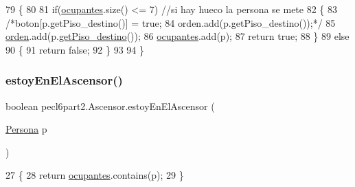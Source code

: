 \begin{DoxyCode}
79     \{
80         
81         \textcolor{keywordflow}{if}(\mbox{\hyperlink{classpecl6part2_1_1_ascensor_af4dd01a24c9588e94061d4e61045563a}{ocupantes}}.size() <= 7) \textcolor{comment}{//si hay hueco la persona se mete}
82         \{
83             \textcolor{comment}{/*boton[p.getPiso\_destino()] = true;}
84 \textcolor{comment}{            orden.add(p.getPiso\_destino());*/}
85             \mbox{\hyperlink{classpecl6part2_1_1_ascensor_a92a9c3265671bd3d2654626f62094cf9}{orden}}.add(p.\mbox{\hyperlink{classpecl6part1_1_1_persona_a82e55b6a597ab6cc0aa1d8fcfed9164b}{getPiso\_destino}}());
86             \mbox{\hyperlink{classpecl6part2_1_1_ascensor_af4dd01a24c9588e94061d4e61045563a}{ocupantes}}.add(p);
87             \textcolor{keywordflow}{return} \textcolor{keyword}{true};
88         \}
89         \textcolor{keywordflow}{else}
90         \{
91             \textcolor{keywordflow}{return} \textcolor{keyword}{false};
92         \}
93         
94     \}
\end{DoxyCode}
\mbox{\label{classpecl6part2_1_1_ascensor_a0ec994e509b6cddd706e1f6ee613d6f8}} 
\subsubsection{\texorpdfstring{estoy\+En\+El\+Ascensor()}{estoyEnElAscensor()}}
{\footnotesize\ttfamily boolean pecl6part2.\+Ascensor.\+estoy\+En\+El\+Ascensor (\begin{DoxyParamCaption}\item[{\mbox{\hyperlink{classpecl6part2_1_1_persona}{Persona}}}]{p }\end{DoxyParamCaption})\hspace{0.3cm}{\ttfamily [inline]}}


\begin{DoxyCode}
27     \{
28         \textcolor{keywordflow}{return} \mbox{\hyperlink{classpecl6part2_1_1_ascensor_af4dd01a24c9588e94061d4e61045563a}{ocupantes}}.contains(p);
29     \}
\end{DoxyCode}
\mbox{\label{classpecl6part2_1_1_ascensor_ab558a9179249070810128b1355edb385}} 

